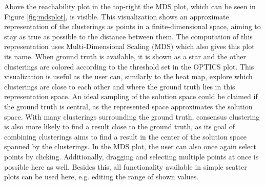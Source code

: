 \documentclass[
	a4paper,
	english,
	twoside,
	openright,               
	11pt                            
	]{report}
\begin{document}
Above the reachability plot in the top-right the MDS plot, which can be seen in Figure \ref{fig:mdsplot}, is visible. This visualization shows an approximate representation of the clusterings as points in a finite-dimensional space, aiming to stay as true as possible to the distance between them. The computation of this representation uses Multi-Dimensional Scaling (MDS) \cite{mds} which also gives this plot its name. When ground truth is available, it is shown as a star and the other clusterings are colored according to the threshold set in the OPTICS plot. This visualization is useful as the user can, similarly to the heat map, explore which clusterings are close to each other and where the ground truth lies in this representation space. An ideal sampling of the solution space could be claimed if the ground truth is central, as the represented space approximates the solution space. With many clusterings surrounding the ground truth, consensus clustering is also more likely to find a result close to the ground truth, as its goal of combining clusterings aims to find a result in the center of the solution space spanned by the clusterings. In the MDS plot, the user can also once again select points by clicking. Additionally, dragging and selecting multiple points at once is possible here as well. Besides this, all functionality available in simple scatter plots can be used here, e.g. editing the range of shown values.
\end{document}
